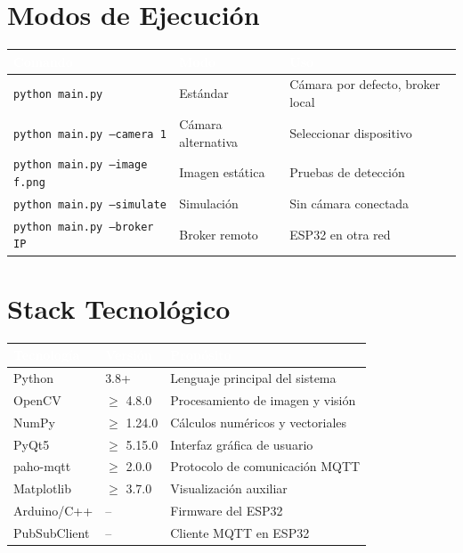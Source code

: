 \documentclass[11pt,a4paper]{article}
\begin{document}
\section{Modos de Ejecución}

\begin{table}[h!]
\centering
{}
\begin{tabularx}{\textwidth}{l l X}
    \toprule
    \rowcolor{azultabla}\textcolor{white}{\textbf{Comando}} & \textcolor{white}{\textbf{Modo}} & \textcolor{white}{\textbf{Uso}} \\
    \midrule
    \texttt{python main.py}              & Estándar           & Cámara por defecto, broker local \\
    \texttt{python main.py --camera 1}   & Cámara alternativa & Seleccionar dispositivo \\
    \texttt{python main.py --image f.png}& Imagen estática    & Pruebas de detección \\
    \texttt{python main.py --simulate}   & Simulación         & Sin cámara conectada \\
    \texttt{python main.py --broker IP}  & Broker remoto      & ESP32 en otra red \\
    \bottomrule
\end{tabularx}
\end{table}

\section{Stack Tecnológico}

\begin{table}[h!]
\centering
{}
\begin{tabularx}{\textwidth}{l l X}
    \toprule
    \rowcolor{azultabla}\textcolor{white}{\textbf{Tecnología}} & \textcolor{white}{\textbf{Versión}} & \textcolor{white}{\textbf{Propósito}} \\
    \midrule
    Python       & 3.8+       & Lenguaje principal del sistema \\
    OpenCV       & $\geq$ 4.8.0  & Procesamiento de imagen y visión \\
    NumPy        & $\geq$ 1.24.0 & Cálculos numéricos y vectoriales \\
    PyQt5        & $\geq$ 5.15.0 & Interfaz gráfica de usuario \\
    paho-mqtt    & $\geq$ 2.0.0  & Protocolo de comunicación MQTT \\
    Matplotlib   & $\geq$ 3.7.0  & Visualización auxiliar \\
    Arduino/C++  & --             & Firmware del ESP32 \\
    PubSubClient & --             & Cliente MQTT en ESP32 \\
    \bottomrule
\end{tabularx}
\end{table}
\end{document}
